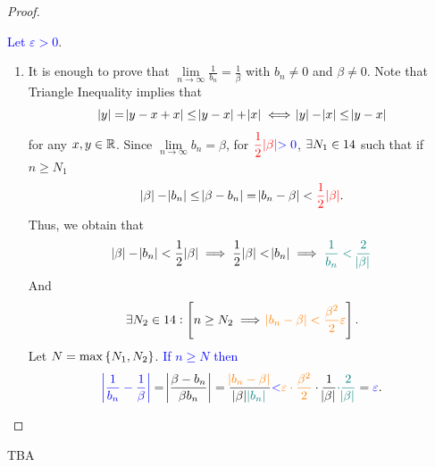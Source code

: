 \documentclass[11pt,openany]{article}
\begin{document}
\begin{note}[]
\begin{proof}
\begin{flushleft}
\begin{minipage}[t]{0.495\textwidth}
\end{minipage}
\end{flushleft}
\newpage
\textcolor{blue}{Let $\varepsilon>0$}. \begin{enumerate}[(1)]
	\item It is enough to prove that $\displaystyle\lim\limits_{n\to\infty}\frac{1}{b_n}=\frac{1}{\beta}$ with $b_n\neq 0$ and $\beta\neq 0$. Note that Triangle Inequality implies that \[
	\abs{y}=\abs{y-x+x}\leq\abs{y-x}+\abs{x}\iff\abs{y}-\abs{x}\leq\abs{y-x}
	\] for any $x,y\in\mathbb{R}$. Since $\lim\limits_{n\to\infty}b_n=\beta$, for $\displaystyle\textcolor{red}{\frac{1}{2}\abs{\beta}}\textcolor{blue}{>0}$, $\exists N_1\in14$ such that if $n\geq N_1$ \[
	\abs{\beta}-\abs{b_n}\leq\abs{\beta-b_n}=\abs{b_n-\beta}<\textcolor{red}{\frac{1}{2}\abs{\beta}}.
	\] Thus, we obtain that \[
	\abs{\beta}-\abs{b_n}<\frac{1}{2}\abs{\beta}\implies\frac{1}{2}\abs{\beta}<\abs{b_n}\implies\textcolor{teal}{\frac{1}{b_n}<\frac{2}{\abs{\beta}}}
	\] And \[
	\exists N_2\in14:\left[n\geq N_2\implies\textcolor{orange}{\abs{b_n-\beta}<\frac{\beta^2}{2}\varepsilon}\right].
	\] Let \textcolor{blue}{$N=\max\set{N_1,N_2}$}. \textcolor{blue}{If $n\geq N$ then} \[
	\textcolor{blue}{\abs{\frac{1}{b_n}-\frac{1}{\beta}}}=\abs{\frac{\beta-b_n}{\beta b_n}}=\frac{\textcolor{orange}{\abs{b_n-\beta}}}{\abs{\beta}\textcolor{teal}{\abs{b_n}}}\textcolor{blue}{<}\textcolor{orange}{\varepsilon\cdot\frac{\beta^2}{2}}\cdot\frac{1}{\abs{\beta}}\textcolor{teal}{\cdot\frac{2}{\abs{\beta}}}=\textcolor{blue}{\varepsilon}.
	\]
\end{enumerate}
\end{proof}
\end{note}
\begin{note}
	TBA
\end{note}
\vfill
\end{document}
